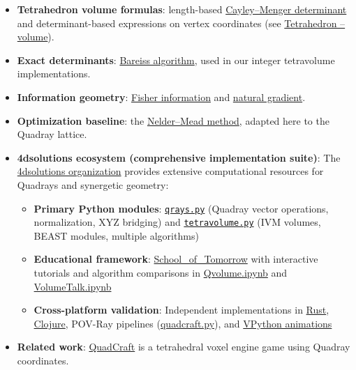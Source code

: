 \documentclass[
]{article}
\providecommand{\tightlist}{%
  \setlength{\itemsep}{0pt}\setlength{\parskip}{0pt}}
\begin{document}
\begin{itemize}
\tightlist
\item
  \textbf{Tetrahedron volume formulas}: length-based
  \href{https://en.wikipedia.org/wiki/Cayley\%E2\%80\%93Menger_determinant}{Cayley--Menger
  determinant} and determinant-based expressions on vertex coordinates
  (see
  \href{https://en.wikipedia.org/wiki/Tetrahedron\#Volume}{Tetrahedron
  -- volume}).
\item
  \textbf{Exact determinants}:
  \href{https://en.wikipedia.org/wiki/Bareiss_algorithm}{Bareiss
  algorithm}, used in our integer tetravolume implementations.
\item
  \textbf{Information geometry}:
  \href{https://en.wikipedia.org/wiki/Fisher_information}{Fisher
  information} and
  \href{https://en.wikipedia.org/wiki/Natural_gradient}{natural
  gradient}.
\item
  \textbf{Optimization baseline}: the
  \href{https://en.wikipedia.org/wiki/Nelder\%E2\%80\%93Mead_method}{Nelder--Mead
  method}, adapted here to the Quadray lattice.
\item
  \textbf{4dsolutions ecosystem (comprehensive implementation suite)}:
  The \href{https://github.com/4dsolutions}{4dsolutions organization}
  provides extensive computational resources for Quadrays and synergetic
  geometry:

  \begin{itemize}
  \tightlist
  \item
    \textbf{Primary Python modules}:
    \href{https://github.com/4dsolutions/m4w/blob/main/qrays.py}{\texttt{qrays.py}}
    (Quadray vector operations, normalization, XYZ bridging) and
    \href{https://github.com/4dsolutions/m4w/blob/main/tetravolume.py}{\texttt{tetravolume.py}}
    (IVM volumes, BEAST modules, multiple algorithms)
  \item
    \textbf{Educational framework}:
    \href{https://github.com/4dsolutions/School_of_Tomorrow}{School\_of\_Tomorrow}
    with interactive tutorials and algorithm comparisons in
    \href{https://github.com/4dsolutions/School_of_Tomorrow/blob/master/Qvolume.ipynb}{Qvolume.ipynb}
    and
    \href{https://github.com/4dsolutions/School_of_Tomorrow/blob/master/VolumeTalk.ipynb}{VolumeTalk.ipynb}
  \item
    \textbf{Cross-platform validation}: Independent implementations in
    \href{https://github.com/4dsolutions/rusty_rays}{Rust},
    \href{https://github.com/4dsolutions/synmods}{Clojure}, POV-Ray
    pipelines
    (\href{https://github.com/4dsolutions/School_of_Tomorrow/blob/master/quadcraft.py}{quadcraft.py}),
    and \href{https://github.com/4dsolutions/BookCovers}{VPython
    animations}
  \end{itemize}
\item
  \textbf{Related work}:
  \href{https://github.com/docxology/quadcraft/}{QuadCraft} is a
  tetrahedral voxel engine game using Quadray coordinates.
\end{itemize}
\end{document}
